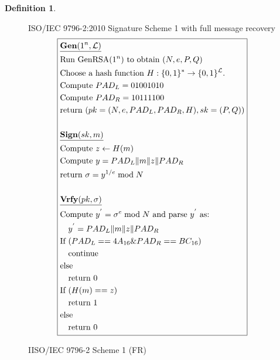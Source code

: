 \documentclass[]{final_report}
\theoremstyle{definition}
\newtheorem{definition}{Definition}[chapter]
\begin{document}
\begin{definition}
\begin{figure}[H]
\centering
\hfill ISO/IEC 9796-2:2010 Signature Scheme 1 with full message recovery\hfill\phantom{} 
\[
\boxed{
\begin{aligned}
&\underline{\textbf{\text{Gen}} (1^n, \mathcal{L})} \\
&\text{Run GenRSA}(1^n) \text{ to obtain } (N, e, P, Q) \\
&\text{Choose a hash function } H : \{0, 1\}^* \rightarrow \{0, 1\}^\mathcal{L}. \\
&\text{Compute } PAD_{L} = 01001010 \\
&\text{Compute } PAD_{R} = 10111100 \\
&\text{return } (pk = (N, e, PAD_{L}, PAD_{R}, H), sk = (P, Q)) \\
\\
&\underline{\textbf{\text{Sign}} (sk, m)} \\
&\text{Compute } z \leftarrow H(m) \\
&\text{Compute } y = PAD_{L} \| m \| z \| PAD_{R} \\
&\text{return } \sigma = y^{1/e} \bmod N \\
\\
&\underline{\textbf{\text{Vrfy}} (pk, \sigma)} \\
&\text{Compute } y^{'} = \sigma^{e} \bmod N \text{ and parse } y^{'} \text{ as: } \\
&\quad y^{'} = PAD_{L} \| m \| z \| PAD_{R} \\
&\text{If } (PAD_{L} == 4A_{16} \& PAD_{R} == BC_{16}) \\
&\quad \text{continue} \\
&\text{else} \\
&\quad \text{return } 0 \\
&\text{If } (H(m) == z) \\
&\quad \text{return } 1 \\
&\text{else} \\
&\quad \text{return } 0 
\end{aligned}
}
\]
\caption{IISO/IEC 9796-2 Scheme 1 (FR)}
\label{fig:isoiec9796-full}
\end{figure}
\end{definition}
\end{document}
